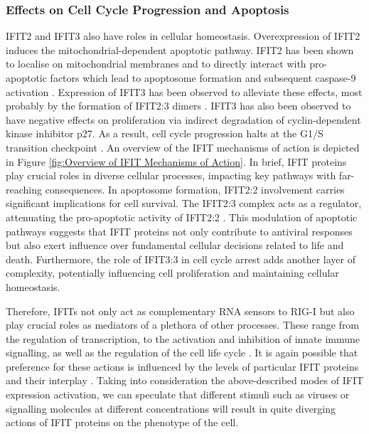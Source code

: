 \subsubsection{Effects on Cell Cycle Progression and Apoptosis} \label{Effects on Cell Cycle Progression and Apoptosis}
IFIT2 and IFIT3 also have roles in cellular homeostasis. Overexpression of IFIT2 induces the mitochondrial-dependent apoptotic pathway. IFIT2 has been shown to localise on mitochondrial membranes and to directly interact with pro-apoptotic factors which lead to apoptosome formation and subsequent caspase-9 activation \cite{Chen2017InhibitionApoptosis, Diamond2013TheProteins}. Expression of IFIT3 has been observed to alleviate these effects, most probably by the formation of IFIT2:3 dimers \cite{Mears2018BetterResponse, Stawowczyk2011TheApoptosis}. IFIT3 has also been observed to have negative effects on proliferation via indirect degradation of cyclin-dependent kinase inhibitor p27. As a result, cell cycle progression halts at the G1/S transition checkpoint \cite{Xiao2006RIG-GProteins}. An overview of the IFIT mechanisms of action is depicted in Figure \ref{fig:Overview of IFIT Mechanisms of Action}. In brief, IFIT proteins play crucial roles in diverse cellular processes, impacting key pathways with far-reaching consequences. In apoptosome formation, IFIT2:2 involvement carries significant implications for cell survival. The IFIT2:3 complex acts as a regulator, attenuating the pro-apoptotic activity of IFIT2:2 \cite{Stawowczyk2011TheApoptosis}. This modulation of apoptotic pathways suggests that IFIT proteins not only contribute to antiviral responses but also exert influence over fundamental cellular decisions related to life and death. Furthermore, the role of IFIT3:3 in cell cycle arrest adds another layer of complexity, potentially influencing cell proliferation and maintaining cellular homeostasis.

Therefore, IFITs not only act as complementary RNA sensors to RIG-I but also play crucial roles as mediators of a plethora of other processes. These range from the regulation of transcription, to the activation and inhibition of innate immune signalling, as well as the regulation of the cell life cycle \cite{Xiao2006RIG-GProteins}. It is again possible that preference for these actions is influenced by the levels of particular IFIT proteins and their interplay \cite{Mears2018BetterResponse}. Taking into consideration the above-described modes of IFIT expression activation, we can speculate that different stimuli such as viruses or signalling molecules at different concentrations will result in quite diverging actions of IFIT proteins on the phenotype of the cell.

